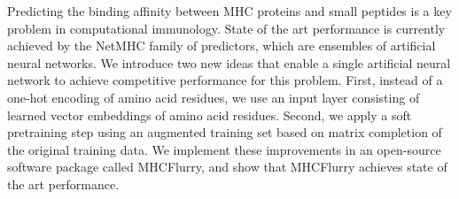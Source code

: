 Predicting the binding affinity between MHC proteins and small peptides is a key problem in computational immunology. State of the art performance is currently achieved by the NetMHC family of predictors, which are ensembles of artificial neural networks. We introduce two new ideas that enable a single artificial neural network to achieve competitive performance for this problem. First, instead of a one-hot encoding of amino acid residues, we use an input layer consisting of learned vector embeddings of amino acid residues. Second, we apply a soft pretraining step using an augmented training set based on matrix completion of the original training data. We implement these improvements in an open-source software package called MHCFlurry, and show that MHCFlurry achieves state of the art performance. 
